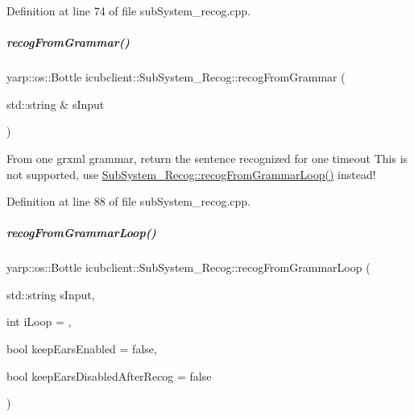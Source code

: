 Definition at line 74 of file sub\+System\+\_\+recog.\+cpp.

\mbox{\label{group__icubclient__subsystems_a0668882e39bd038825a47a835180e4c6}} 
\subparagraph{\texorpdfstring{recog\+From\+Grammar()}{recogFromGrammar()}}
{\footnotesize\ttfamily yarp\+::os\+::\+Bottle icubclient\+::\+Sub\+System\+\_\+\+Recog\+::recog\+From\+Grammar (\begin{DoxyParamCaption}\item[{std\+::string \&}]{s\+Input }\end{DoxyParamCaption})}



From one grxml grammar, return the sentence recognized for one timeout This is not supported, use \hyperlink{group__icubclient__subsystems_ab0fdeaa8f84fb8d1062259921407d0f7}{Sub\+System\+\_\+\+Recog\+::recog\+From\+Grammar\+Loop()} instead! 



Definition at line 88 of file sub\+System\+\_\+recog.\+cpp.

\mbox{\label{group__icubclient__subsystems_ab0fdeaa8f84fb8d1062259921407d0f7}} 
\subparagraph{\texorpdfstring{recog\+From\+Grammar\+Loop()}{recogFromGrammarLoop()}}
{\footnotesize\ttfamily yarp\+::os\+::\+Bottle icubclient\+::\+Sub\+System\+\_\+\+Recog\+::recog\+From\+Grammar\+Loop (\begin{DoxyParamCaption}\item[{std\+::string}]{s\+Input,  }\item[{int}]{i\+Loop = {},  }\item[{bool}]{keep\+Ears\+Enabled = {\ttfamily false},  }\item[{bool}]{keep\+Ears\+Disabled\+After\+Recog = {\ttfamily false} }\end{DoxyParamCaption})}



